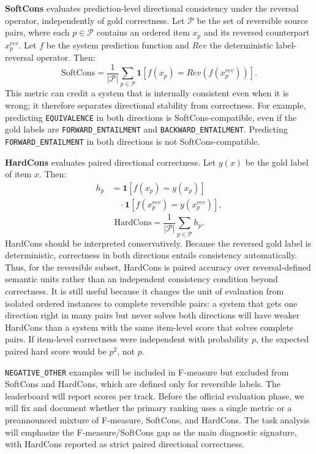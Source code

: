 \documentclass[11pt]{article}
\begin{document}
\textbf{SoftCons} evaluates prediction-level directional consistency under the reversal operator, independently of gold correctness.
Let \(\mathcal{P}\) be the set of reversible source pairs, where each \(p\in\mathcal{P}\) contains an ordered item \(x_p\) and its reversed counterpart \(x_p^{rev}\).
Let \(f\) be the system prediction function and \(Rev\) the deterministic label-reversal operator.
Then:
\[
  \mathrm{SoftCons}
  =
  \frac{1}{|\mathcal{P}|}
  \sum_{p\in\mathcal{P}}
  \mathbf{1}\!\left[f(x_p)=Rev(f(x_p^{rev}))\right].
\]
This metric can credit a system that is internally consistent even when it is wrong; it therefore separates directional stability from correctness.
For example, predicting \texttt{EQUIVALENCE} in both directions is SoftCons-compatible, even if the gold labels are \texttt{FORWARD\_ENTAILMENT} and \texttt{BACKWARD\_ENTAILMENT}.
Predicting \texttt{FORWARD\_ENTAILMENT} in both directions is not SoftCons-compatible.

\textbf{HardCons} evaluates paired directional correctness.
Let \(y(x)\) be the gold label of item \(x\).
Then:
\[
  \begin{aligned}
  h_p &=
  \mathbf{1}\!\left[f(x_p)=y(x_p)\right] \\
  &\quad \cdot
  \mathbf{1}\!\left[f(x_p^{rev})=y(x_p^{rev})\right],
  \end{aligned}
\]
\[
  \mathrm{HardCons}
  =
  \frac{1}{|\mathcal{P}|}
  \sum_{p\in\mathcal{P}}
  h_p .
\]
HardCons should be interpreted conservatively.
Because the reversed gold label is deterministic, correctness in both directions entails consistency automatically.
Thus, for the reversible subset, HardCons is paired accuracy over reversal-defined semantic units rather than an independent consistency condition beyond correctness.
It is still useful because it changes the unit of evaluation from isolated ordered instances to complete reversible pairs: a system that gets one direction right in many pairs but never solves both directions will have weaker HardCons than a system with the same item-level score that solves complete pairs.
If item-level correctness were independent with probability \(p\), the expected paired hard score would be \(p^2\), not \(p\).

\texttt{NEGATIVE\_OTHER} examples will be included in F-measure but excluded from SoftCons and HardCons, which are defined only for reversible labels.
The leaderboard will report scores per track.
Before the official evaluation phase, we will fix and document whether the primary ranking uses a single metric or a preannounced mixture of F-measure, SoftCons, and HardCons.
The task analysis will emphasize the F-measure/SoftCons gap as the main diagnostic signature, with HardCons reported as strict paired directional correctness.
\end{document}
